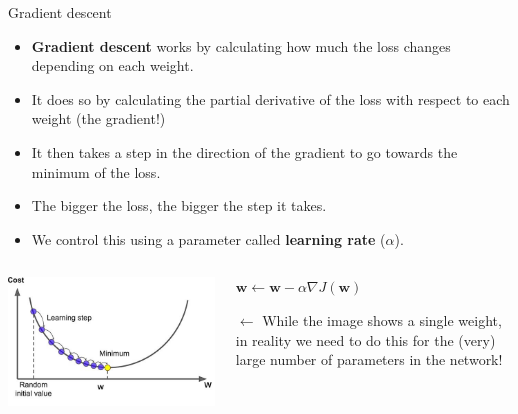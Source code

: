 \documentclass[9pt, aspectratio=169]{beamer}
\begin{document}
\begin{frame}
    {Gradient descent}
    \begin{itemize}[<+->]
        \item \textbf{Gradient descent} works by calculating how much the loss changes depending on each weight.
        \item It does so by calculating the partial derivative of the loss with respect to each weight (the gradient!)
        \item It then takes a step in the direction of the gradient to go towards the minimum of the loss.
        \item The bigger the loss, the bigger the step it takes.
        \item We control this using a parameter called \textbf{learning rate} ($\alpha$).
    \end{itemize}
    \pause
    \begin{columns}
        \begin{column}{.5\textwidth}
            \centering
            \includegraphics[width=\textwidth]{gradient_descent.jpg}
        \end{column}
        \begin{column}{.5\textwidth}
            \LARGE
            $\mathbf{w} \leftarrow \mathbf{w} - \alpha \nabla J(\mathbf{w})$

            \vspace{2em}
            \footnotesize
            $\leftarrow$ While the image shows a single weight, in reality we need to do this for the (very) large number of parameters in the network!
        \end{column}
    \end{columns}
\end{frame}
\end{document}
